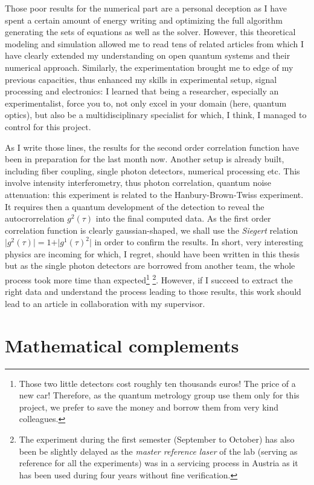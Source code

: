 \documentclass[10pt]{report}
\begin{document}
Those poor results for the numerical part are a personal deception as I have spent a certain amount of energy writing and optimizing the full algorithm generating the sets of equations as well as the solver. However, this theoretical modeling and simulation allowed me to read tens of related articles from which I have clearly extended my understanding on open quantum systems and their numerical approach. Similarly, the experimentation brought me to edge of my previous capacities, thus enhanced my skills in experimental setup, signal processing and electronics: I learned that being a researcher, especially an experimentalist, force you to, not only excel in your domain (here, quantum optics), but also be a multidisciplinary specialist for which, I think, I managed to control for this project.

As I write those lines, the results for the second order correlation function have been in preparation for the last month now. Another setup is already built, including fiber coupling, single photon detectors, numerical processing etc. This involve intensity interferometry, thus photon correlation, quantum noise attenuation: this experiment is related to the Hanbury-Brown-Twiss experiment. It requires then a quantum development of the detection to reveal the autocrorrelation $g^2(\tau)$ into the final computed data. As the first order correlation function is clearly gaussian-shaped, we shall use the \textit{Siegert} relation $\vert g^2(\tau) \vert = 1 + \vert g^1(\tau)^2 \vert$ in order to confirm the results. In short, very interesting physics are incoming for which, I regret, should have been written in this thesis but as the single photon detectors are borrowed from another team, the whole process took more time than expected\footnote{Those two little detectors cost roughly ten thousands euros! The price of a new car! Therefore, as the quantum metrology group use them only for this project, we prefer to save the money and borrow them from very kind colleagues.} \footnote{The experiment during the first semester (September to October) has also been be slightly delayed as the \textit{master reference laser} of the lab (serving as reference for all the experiments) was in a servicing process in Austria as it has been used during four years without fine verification.}. However, if I succeed to extract the right data and understand the process leading to those results, this work should lead to an article in collaboration with my supervisor.

\appendix
\chapter{Mathematical complements}
\end{document}
